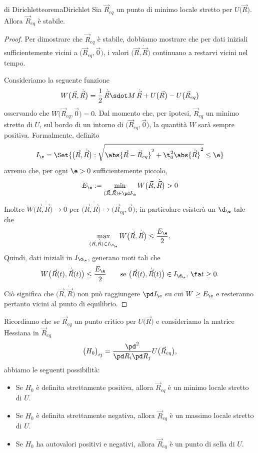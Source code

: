 \begin{teor}{di Dirichlet}{teoremaDirichlet}
	Sia \(\vec{R}_{eq}\) un punto di minimo locale stretto per \(U\big(\vec{R}\big)\).
	Allora \(\vec{R}_{eq}\) è stabile.
\end{teor}
%
%
\begin{proof}
	Per dimostrare che \(\vec{R}_{eq}\) è stabile, dobbiamo mostrare che per dati iniziali sufficientemente vicini a \(\big(\vec{R}_{eq},\vec{0}\big)\), i valori \(\big(\vec{R},\dot{\vec{R}}\big)\) continuano a restarvi vicini nel tempo.
	
	Consideriamo la seguente funzione
	\[
		W\big(\vec{R},\dot{\vec{R}}\big) = \frac{1}{2}\,\dot{\vec{R}}\sdot M\,\dot{\vec{R}} + U\big(\vec{R}\big) - U\big(\vec{R}_{eq}\big)
	\]
	osservando che \(W\big(\vec{R}_{eq},\vec{0}\big)=0\).
	Dal momento che, per ipotesi, \(\vec{R}_{eq}\) un minimo stretto di \(U\), sul bordo di un intorno di \(\big(\vec{R}_{eq},\vec{0}\big)\), la quantità \(W\) sarà sempre positiva. Formalmente, definito
	\[
		I_\e = \Set{\big(\vec{R},\dot{\vec{R}}\big) : \sqrt{\abs{\vec{R}-\vec{R}_{eq}}^2+\t_0^2\abs{\dot{\vec{R}}}^2} \le \e}
	\]
	avremo che, per ogni \(\e>0\) sufficientemente piccolo,
	\[
		E_\e:=\min_{(\vec{R},\dot{\vec{R}}) \in \pd I_\e} W\big(\vec{R},\dot{\vec{R}}\big) > 0
	\]
	Inoltre \(W\big(\vec{R},\dot{\vec{R}}\big) \to 0\) per \(\big(\vec{R},\dot{\vec{R}}\big) \to \big(\vec{R}_{eq},\vec{0}\big)\); in particolare esisterà un \(\d_\e\) tale che
	\[
		\max_{(\vec{R},\dot{\vec{R}})\in I_{\d_\e}} W\big(\vec{R},\dot{\vec{R}}\big) \le \frac{E_\e}{2}.
	\]
	Quindi, dati iniziali in \(I_{\d_\e}\), generano moti tali che
	\[
		W\big(\vec{R}(t),\dot{\vec{R}}(t)\big) \le \frac{E_\e}{2} \qquad\text{se }\big(\vec{R}(t),\dot{\vec{R}}(t)\big) \in I_{\d_\e},\,\fa t \ge 0.
	\]
	Ciò significa che \(\big(\vec{R},\dot{\vec{R}}\big)\) non può raggiungere \(\pd I_\e\) su cui \(W \ge E_\e\) e resteranno pertanto vicini al punto di equilibrio.
\end{proof}

\begin{oss}
	Ricordiamo che se \(\vec{R}_{eq}\) un punto critico per \(U\big(\vec{R}\big)\) e consideriamo la matrice Hessiana in \(\vec{R}_{eq}\)
	\[
		\big(H_0\big)_{i j} = \frac{\pd^2}{\pd R_i \pd R_j}U\big(\vec{R}_{eq}\big),
	\]
	abbiamo le seguenti possibilità:
	\begin{itemize}
		\item Se \(H_0\) è definita strettamente positiva, allora \(\vec{R}_{eq}\) è un minimo locale stretto di \(U\).
		\item Se \(H_0\) è definita strettamente negativa, allora \(\vec{R}_{eq}\) è un massimo locale stretto di \(U\).
		\item Se \(H_0\) ha autovalori positivi e negativi, allora \(\vec{R}_{eq}\) è un punto di sella di \(U\).
	\end{itemize}
\end{oss}

